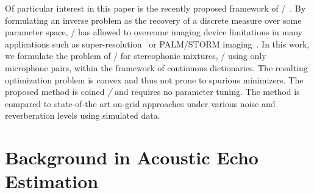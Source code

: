 \mynewline
Of particular interest in this paper is the recently proposed framework of \CDdef/~.
By formulating an inverse problem as the recovery of a discrete measure over some parameter space, \CD/ has allowed to overcome imaging device limitations in many applications such as super-resolution~ or PALM/STORM imaging~.
In this work, we formulate the problem of \AER/ for stereophonic mixtures, \ie/ using only microphone pairs, within the framework of continuous dictionaries.
The resulting optimization problem is convex and thus not prone to spurious minimizers.
The proposed method is coined \emph{\BLASTERdef/} and requires no parameter tuning.
The method is compared to state-of-the art on-grid approaches under various noise and reverberation levels using simulated data.


\section{Background in Acoustic Echo Estimation}\label{sec:blaster:background}

